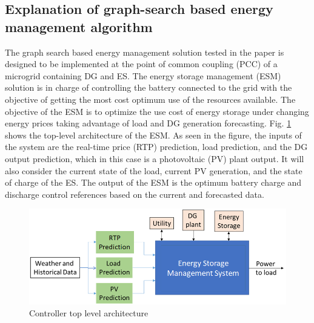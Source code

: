 \subsection{Explanation of graph-search based energy management algorithm}
The graph search based energy management solution tested in the paper is designed to be implemented at the point of common coupling (PCC) of a microgrid containing DG and ES. The energy storage management (ESM) solution  is in charge of controlling the battery connected to the grid with the objective of getting the most cost optimum use of the resources available. The objective of the ESM is to optimize the use cost of energy storage under changing energy prices taking advantage of load and DG generation forecasting. Fig. \ref{fig:F1_CA} shows the top-level architecture of the ESM. As seen in the figure, the inputs of the system are the real-time price (RTP) prediction, load prediction, and the DG output prediction, which in this case is a photovoltaic (PV) plant output. It will also consider the current state of the load, current PV generation, and the state of charge of the ES. The output of the ESM is the optimum battery charge and discharge control references based on the current and forecasted data.



\begin{figure}[!ht]
    \centering
    \includegraphics[width = 0.8\linewidth]{figs/EMS_FIG.png}
    \caption{Controller top level architecture}
    \label{fig:F1_CA}
\end{figure}

